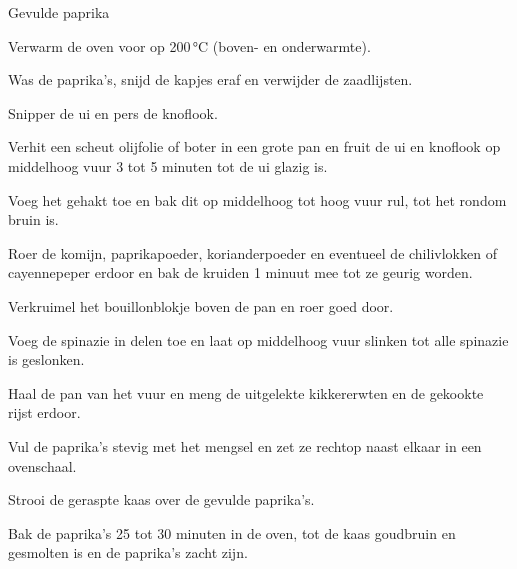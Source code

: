 \begin{recipe}{Gevulde paprika}
\begin{steps}
  \item Verwarm de oven voor op 200\,°C (boven- en onderwarmte).
  \item Was de paprika's, snijd de kapjes eraf en verwijder de zaadlijsten.
  \item Snipper de ui en pers de knoflook.
  \item Verhit een scheut olijfolie of boter in een grote pan en fruit de ui
        en knoflook op middelhoog vuur 3 tot 5 minuten tot de ui glazig is.
  \item Voeg het gehakt toe en bak dit op middelhoog tot hoog vuur rul, tot
        het rondom bruin is.
  \item Roer de komijn, paprikapoeder, korianderpoeder en eventueel de
        chilivlokken of cayennepeper erdoor en bak de kruiden 1 minuut mee
        tot ze geurig worden.
  \item Verkruimel het bouillonblokje boven de pan en roer goed door.
  \item Voeg de spinazie in delen toe en laat op middelhoog vuur slinken tot
        alle spinazie is geslonken.
  \item Haal de pan van het vuur en meng de uitgelekte kikkererwten en de
        gekookte rijst erdoor.
  \item Vul de paprika's stevig met het mengsel en zet ze rechtop naast
        elkaar in een ovenschaal.
  \item Strooi de geraspte kaas over de gevulde paprika's.
  \item Bak de paprika's 25 tot 30 minuten in de oven, tot de kaas goudbruin
        en gesmolten is en de paprika's zacht zijn.
\end{steps}

\end{recipe}
